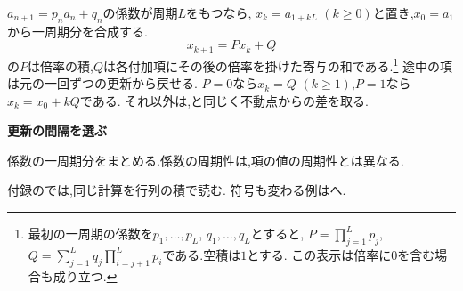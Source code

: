   $a_{n+1}=p_na_n+q_n$の係数が周期$L$をもつなら,
  $x_k=a_{1+kL}$ $(k\ge0)$と置き,$x_0=a_1$から一周期分を合成する.
  \[
    x_{k+1}=Px_k+Q
  \]
  の$P$は倍率の積,$Q$は各付加項にその後の倍率を掛けた寄与の和である.\footnote{最初の一周期の係数を$p_1,\ldots,p_L$, $q_1,\ldots,q_L$とすると,
  $P=\prod_{j=1}^L p_j$, $Q=\sum_{j=1}^L q_j\prod_{i=j+1}^L p_i$である.空積は$1$とする.
  この表示は倍率に$0$を含む場合も成り立つ.}
  途中の項は元の一回ずつの更新から戻せる.
  $P=0$なら$x_k=Q$ $(k\ge1)$,$P=1$なら$x_k=x_0+kQ$である.
  それ以外は,と同じく不動点からの差を取る.

  \begin{bookpoint}
    \textbf{更新の間隔を選ぶ}\par
    係数の一周期分をまとめる.係数の周期性は,項の値の周期性とは異なる.
  \end{bookpoint}
  付録のでは,同じ計算を行列の積で読む.
  符号も変わる例はへ.
